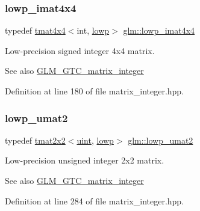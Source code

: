 \subsubsection{\texorpdfstring{lowp\_imat4x4}{lowp\_imat4x4}}
{\footnotesize\ttfamily typedef \mbox{\hyperlink{structglm_1_1tmat4x4}{tmat4x4}}$<$int, \mbox{\hyperlink{namespaceglm_a0f04f086094c747d227af4425893f545ae161af3fc695e696ce3bf69f7332bc2d}{lowp}}$>$ \mbox{\hyperlink{group__gtc__matrix__integer_ga46f8dc46c3dcde8fa2e8b8f645c0d9ef}{glm\+::lowp\+\_\+imat4x4}}}

Low-\/precision signed integer 4x4 matrix. \begin{DoxySeeAlso}{See also}
\mbox{\hyperlink{group__gtc__matrix__integer}{G\+L\+M\+\_\+\+G\+T\+C\+\_\+matrix\+\_\+integer}} 
\end{DoxySeeAlso}


Definition at line 180 of file matrix\+\_\+integer.\+hpp.

\mbox{\label{group__gtc__matrix__integer_ga0ff71fefa5bfab1462195c3de4f83f67}} 
\subsubsection{\texorpdfstring{lowp\_umat2}{lowp\_umat2}}
{\footnotesize\ttfamily typedef \mbox{\hyperlink{structglm_1_1tmat2x2}{tmat2x2}}$<$\mbox{\hyperlink{group__core__precision_ga4fd29415871152bfb5abd588334147c8}{uint}}, \mbox{\hyperlink{namespaceglm_a0f04f086094c747d227af4425893f545ae161af3fc695e696ce3bf69f7332bc2d}{lowp}}$>$ \mbox{\hyperlink{group__gtc__matrix__integer_ga0ff71fefa5bfab1462195c3de4f83f67}{glm\+::lowp\+\_\+umat2}}}

Low-\/precision unsigned integer 2x2 matrix. \begin{DoxySeeAlso}{See also}
\mbox{\hyperlink{group__gtc__matrix__integer}{G\+L\+M\+\_\+\+G\+T\+C\+\_\+matrix\+\_\+integer}} 
\end{DoxySeeAlso}


Definition at line 284 of file matrix\+\_\+integer.\+hpp.

\mbox{\label{group__gtc__matrix__integer_ga13b2812e9b0af47e0f498391383d145a}} 
